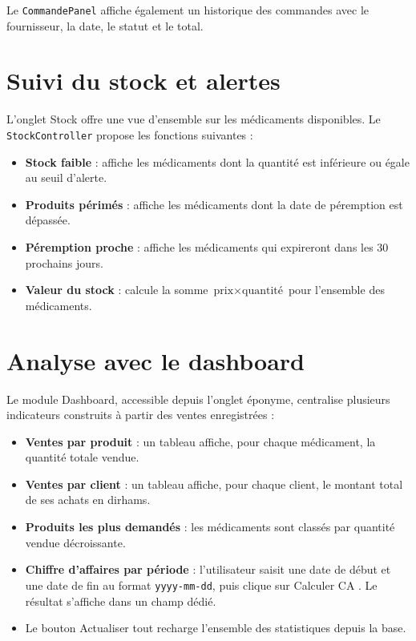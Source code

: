 \documentclass[12pt,a4paper]{report}
\begin{document}
Le \texttt{CommandePanel} affiche également un historique des commandes avec le fournisseur, la date, le statut et le total.

\section{Suivi du stock et alertes}

L'onglet \og Stock \fg{} offre une vue d'ensemble sur les médicaments disponibles. Le \texttt{StockController} propose les fonctions suivantes :

\begin{itemize}[nosep]
  \item \textbf{Stock faible} : affiche les médicaments dont la quantité est inférieure ou égale au seuil d'alerte.
  \item \textbf{Produits périmés} : affiche les médicaments dont la date de péremption est dépassée.
  \item \textbf{Péremption proche} : affiche les médicaments qui expireront dans les 30 prochains jours.
  \item \textbf{Valeur du stock} : calcule la somme $\text{prix} \times \text{quantité}$ pour l'ensemble des médicaments.
\end{itemize}

\section{Analyse avec le dashboard}

Le module Dashboard, accessible depuis l'onglet éponyme, centralise plusieurs indicateurs construits à partir des ventes enregistrées :

\begin{itemize}[nosep]
  \item \textbf{Ventes par produit} : un tableau affiche, pour chaque médicament, la quantité totale vendue.
  \item \textbf{Ventes par client} : un tableau affiche, pour chaque client, le montant total de ses achats en dirhams.
  \item \textbf{Produits les plus demandés} : les médicaments sont classés par quantité vendue décroissante.
  \item \textbf{Chiffre d'affaires par période} : l'utilisateur saisit une date de début et une date de fin au format \texttt{yyyy-mm-dd}, puis clique sur \og Calculer CA \fg. Le résultat s'affiche dans un champ dédié.
  \item Le bouton \og Actualiser tout \fg{} recharge l'ensemble des statistiques depuis la base.
\end{itemize}
\end{document}
